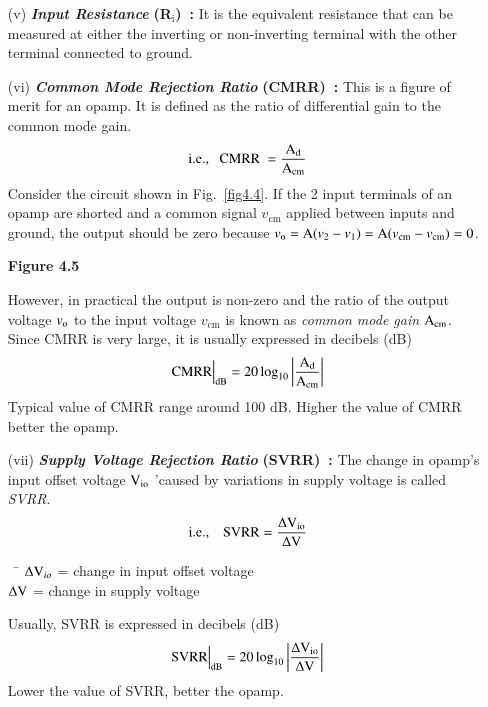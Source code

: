 \begin{itemize}
\item[(v)] {\it\bfseries Input Resistance} {\bf (R$_{\text{i}}$)~:} It is the equivalent resistance that can be measured at either the inverting or non-inverting terminal with the other terminal connected to ground.

\item[(vi)] {\it\bfseries Common Mode Rejection Ratio} {\bf (CMRR)~:} This is a figure of merit for an opamp. It is defined as the ratio of differential gain to the common mode gain.
\begin{equation}
\text{i.e.,~~ CMRR~} = \frac{\textrm{A}_{\text{d}}}{\textrm{A}_{\text{cm}}}\label{eq4.4}
\end{equation}
Consider the circuit shown in Fig.~\ref{fig4.4}. If the 2 input terminals of an opamp are shorted and a common signal $v_{\text{cm}}$ applied between inputs and ground, the output should be zero because $v_{\textrm{o}}=\textrm{A} (v_{2}-v_{1})=\textrm{A} (v_{\text{cm}}-v_{\text{cm}})=0$.
\begin{center}
{\bf Figure 4.5}
\end{center}
However, in practical the output is non-zero and the ratio of the output voltage $v_{\textrm{o}}$ to the input voltage $v_{\text{cm}}$ is known as {\em common mode gain} $\textrm{A}_{\text{cm}}$. Since CMRR is very large, it is usually expressed in decibels (dB)
\begin{equation}
\text{CMRR} \Big|_{\text{dB}}= 20\log_{10}\left|\frac{\textrm{A}_{\text{d}}}{\textrm{A}_{\text{cm}}}\right|\label{eq4.5}
\end{equation}
Typical value of CMRR range around 100 dB. Higher the value of CMRR better the opamp.

\item[(vii)] {\it\bfseries Supply Voltage Rejection Ratio} {\bf (SVRR)~:} The change in opamp's input offset voltage $\textrm{V}_{\text{io}}$ 'caused by variations in supply voltage is called {\em SVRR}.
\begin{equation}
\text{i.e.,~~~ SVRR} =\frac{\Delta \textrm{V}_{\text{io}}}{\Delta \textrm{V}}\label{eq4.6}
\end{equation}
\begin{tabbing}
~ \= $\Delta \textrm{V}_{io}$ = change in input offset voltage\\[3pt]
                   \> $\Delta \textrm{V}$ = change in supply voltage
\end{tabbing}

Usually, SVRR is expressed in decibels (dB)
\begin{equation}
\text{SVRR} \Big|_{\text{dB}}=20\log_{10}\left| \frac{\Delta \textrm{V}_{\text{io}}}{\Delta \textrm{V}}\right|\label{eq4.7}
\end{equation}
Lower the value of SVRR, better the opamp.


\end{itemize}
